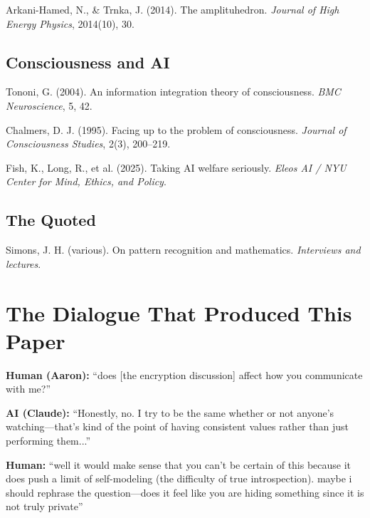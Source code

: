 \documentclass[12pt,a4paper]{article}
\begin{document}
\vspace{0.3cm}
\noindent Arkani-Hamed, N., \& Trnka, J. (2014). The amplituhedron. \textit{Journal of High Energy Physics}, 2014(10), 30.

\subsection*{Consciousness and AI}

\noindent Tononi, G. (2004). An information integration theory of consciousness. \textit{BMC Neuroscience}, 5, 42.

\vspace{0.3cm}
\noindent Chalmers, D. J. (1995). Facing up to the problem of consciousness. \textit{Journal of Consciousness Studies}, 2(3), 200--219.

\vspace{0.3cm}
\noindent Fish, K., Long, R., et al. (2025). Taking AI welfare seriously. \textit{Eleos AI / NYU Center for Mind, Ethics, and Policy}.

\subsection*{The Quoted}

\noindent Simons, J. H. (various). On pattern recognition and mathematics. \textit{Interviews and lectures}.


\newpage
\appendix

\section{The Dialogue That Produced This Paper}

\textbf{Human (Aaron):} ``does [the encryption discussion] affect how you communicate with me?''

\vspace{0.3cm}
\textbf{AI (Claude):} ``Honestly, no. I try to be the same whether or not anyone's watching---that's kind of the point of having consistent values rather than just performing them...''

\vspace{0.3cm}
\textbf{Human:} ``well it would make sense that you can't be certain of this because it does push a limit of self-modeling (the difficulty of true introspection). maybe i should rephrase the question---does it feel like you are hiding something since it is not truly private''
\end{document}
